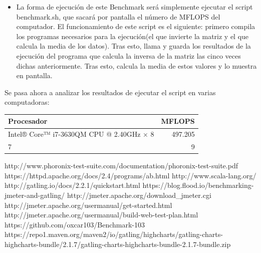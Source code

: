 \begin{itemize}
\begin{itemize}
		\item La forma de ejecución de este Benchmark será simplemente ejecutar el script benchmark.sh, que sacará por pantalla el número de MFLOPS del computador. El funcionamiento de este script es el siguiente: primero compila los programas necesarios para la ejecución(el que invierte la matriz y el que calcula la media de los datos). Tras esto, llama y guarda los resultados de la ejecución del programa que calcula la inversa de la matriz las cinco veces dichas anteriormente. Tras esto, calcula la media de estos valores y lo muestra en pantalla.
	\end{itemize}
	
	Se pasa ahora a analizar los resultados de ejecutar el script en varias computadoras:\\
	
	\begin{center}
		\begin{tabular}{| l || r | }
			\hline
			Procesador & MFLOPS\\ \hline \hline
			Intel® Core™ i7-3630QM CPU @ 2.40GHz × 8  & 497.205 \\ \hline
			7 & 9 \\
			\hline
		\end{tabular}
	\end{center}
	
\end{itemize}



\newpage

\begin{thebibliography}{xx}
	 http://www.phoronix-test-suite.com/documentation/phoronix-test-suite.pdf
	 https://httpd.apache.org/docs/2.4/programs/ab.html
	 http://www.scala-lang.org/
	 http://gatling.io/docs/2.2.1/quickstart.html
	 https://blog.flood.io/benchmarking-jmeter-and-gatling/
	 http://jmeter.apache.org/download\_jmeter.cgi
	 http://jmeter.apache.org/usermanual/get-started.html
	 http://jmeter.apache.org/usermanual/build-web-test-plan.html
	 https://github.com/oxcar103/Benchmark-103
	https://repo1.maven.org/maven2/io/gatling/highcharts/gatling-charts-highcharts-bundle/2.1.7/gatling-charts-highcharts-bundle-2.1.7-bundle.zip
	
	
\end{thebibliography}
